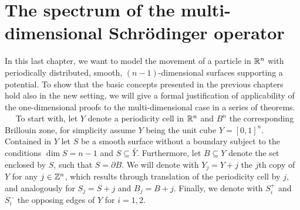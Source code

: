 \chapter{The spectrum of the multi-dimensional Schrödinger operator}  \label{chap:7} 

In this last chapter, we want to model the movement of a particle in $\mathbb{R}^{n}$ with periodically distributed, smooth, $(n-1)$-dimensional surfaces supporting a potential. To show that the basic concepts presented in the previous chapters hold also in the new setting, we will give a formal justification of applicability of the one-dimensional proofs to the multi-dimensional case in a series of theorems.
~\newline ~\newline
To start with, let $Y$ denote a periodicity cell in $\mathbb{R}^{n}$ and $B^{n}$ the corresponding Brillouin zone, for simplicity assume $Y$ being the unit cube $Y = [0, 1]^{n}$. Contained in $Y$ let $S$ be a smooth surface without a boundary subject to the conditions $\dim S = n - 1$ and $S \subseteq \overset{\circ}{Y}$. Furthermore, let $B \subseteq Y$ denote the set enclosed by $S$, such that $S = \partial B$. We will denote with $Y_{j} = Y + j$ the $j$th copy of $Y$ for any $j \in \mathbb{Z}^{n}$, which results through translation of the periodicity cell by $j$, and analogously for $S_{j} = S + j$ and $B_{j} = B + j$. Finally, we denote with $S_{i}^{+}$ and $S_{i}^{-}$ the opposing edges of $Y$ for $i = 1, 2$.

